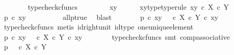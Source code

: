 \begin{isabellebody}
\ \ \ \ \ \ \isamarkupfalse%
\ typecheck{\isacharunderscore}{\kern0pt}cfuncs\isanewline
\ \ \isamarkupfalse%
\isanewline
\ \ \ \ \isamarkupfalse%
\ xy\isanewline
\ \ \ \ \isamarkupfalse%
\ xy{\isacharunderscore}{\kern0pt}type{\isacharbrackleft}{\kern0pt}type{\isacharunderscore}{\kern0pt}rule{\isacharbrackright}{\kern0pt}{\isacharcolon}{\kern0pt}\ {\isachardoublequoteopen}xy\ {\isasymin}\isactrlsub c\ X\ {\isasymtimes}\isactrlsub c\ Y{\isachardoublequoteclose}\isanewline
\ \ \ \ \isamarkupfalse%
\ \isamarkupfalse%
\ {\isachardoublequoteopen}p\ {\isasymcirc}\isactrlsub c\ xy\ {\isacharequal}{\kern0pt}\ {\isasymt}{\isachardoublequoteclose}\isanewline
\ \ \ \ \ \ \isamarkupfalse%
\ all{\isacharunderscore}{\kern0pt}p{\isacharunderscore}{\kern0pt}true\ \isamarkupfalse%
\ blast\isanewline
\ \ \ \ \isamarkupfalse%
\ \isamarkupfalse%
\ {\isachardoublequoteopen}p\ {\isasymcirc}\isactrlsub c\ xy\ {\isacharequal}{\kern0pt}\ {\isasymt}\ {\isasymcirc}\isactrlsub c\ {\isacharparenleft}{\kern0pt}{\isasymbeta}\isactrlbsub X\ {\isasymtimes}\isactrlsub c\ Y\isactrlesub \ {\isasymcirc}\isactrlsub c\ xy{\isacharparenright}{\kern0pt}{\isachardoublequoteclose}\isanewline
\ \ \ \ \ \ \isamarkupfalse%
\ {\isacharparenleft}{\kern0pt}typecheck{\isacharunderscore}{\kern0pt}cfuncs{\isacharcomma}{\kern0pt}\ metis\ id{\isacharunderscore}{\kern0pt}right{\isacharunderscore}{\kern0pt}unit{}\ id{\isacharunderscore}{\kern0pt}type\ one{\isacharunderscore}{\kern0pt}unique{\isacharunderscore}{\kern0pt}element{\isacharparenright}{\kern0pt}\isanewline
\ \ \ \ \isamarkupfalse%
\ \isamarkupfalse%
\ {\isachardoublequoteopen}p\ {\isasymcirc}\isactrlsub c\ xy\ {\isacharequal}{\kern0pt}\ {\isacharparenleft}{\kern0pt}{\isasymt}\ {\isasymcirc}\isactrlsub c\ {\isasymbeta}\isactrlbsub X\ {\isasymtimes}\isactrlsub c\ Y\isactrlesub {\isacharparenright}{\kern0pt}\ {\isasymcirc}\isactrlsub c\ xy{\isachardoublequoteclose}\isanewline
\ \ \ \ \ \ \isamarkupfalse%
\ {\isacharparenleft}{\kern0pt}typecheck{\isacharunderscore}{\kern0pt}cfuncs{\isacharcomma}{\kern0pt}\ smt\ comp{\isacharunderscore}{\kern0pt}associative{}{\isacharparenright}{\kern0pt}\isanewline
\ \ \isamarkupfalse%
\isanewline
\ \ \isamarkupfalse%
\ \isamarkupfalse%
\ {\isachardoublequoteopen}p\isactrlsup {\isasymsharp}\ {\isacharequal}{\kern0pt}\ {\isacharparenleft}{\kern0pt}{\isasymt}\ {\isasymcirc}\isactrlsub c\ {\isasymbeta}\isactrlbsub X\ {\isasymtimes}\isactrlsub c\ Y\isactrlesub {\isacharparenright}{\kern0pt}\isactrlsup {\isasymsharp}{\isachardoublequoteclose}\isanewline

\end{isabellebody}
